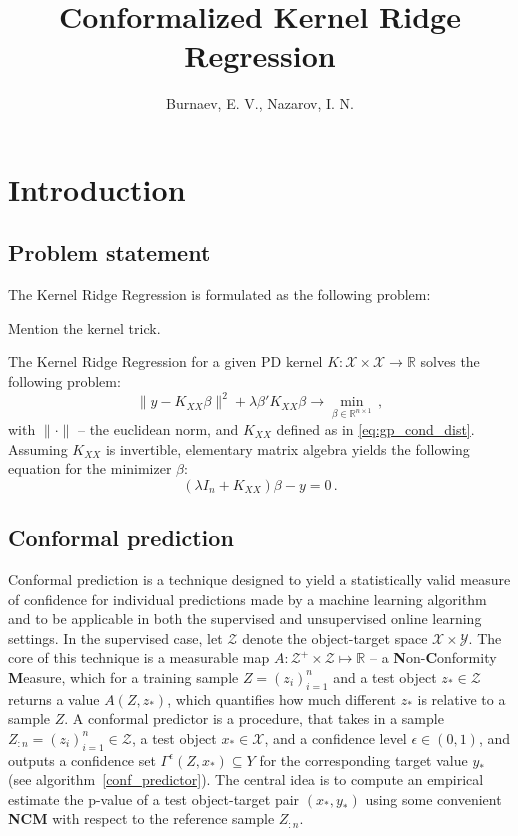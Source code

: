 \documentclass[a4paper]{article}
\title{Conformalized Kernel Ridge Regression}
\author{Burnaev, E. V., Nazarov, I. N.}
\newcommand{\Xcal}{\mathcal{X}}
\newcommand{\Ycal}{\mathcal{Y}}
\newcommand{\Zcal}{\mathcal{Z}}
\newcommand{\Real}{\mathbb{R}}
\begin{document}
\maketitle
\tableofcontents
\clearpage

\section{Introduction} %
\label{sec:introduction}

\subsection{Problem statement} %
\label{sub:problem_statement}

The Kernel Ridge Regression is formulated as the following problem:

Mention the kernel trick.

The Kernel Ridge Regression for a given PD kernel $K:\Xcal\times \Xcal \to \Real$
solves the following problem:
\begin{equation*}
  \|y - K_{XX}\beta\|^2 + \lambda \beta' K_{XX} \beta
    \to \min_{\beta\in \Real^{n\times 1}}
    \,,
\end{equation*}
with $\|\cdot\|$ -- the euclidean norm, and $K_{XX}$ defined as in \ref{eq:gp_cond_dist}.
Assuming $K_{XX}$ is invertible, elementary matrix algebra yields the following
equation for the minimizer $\beta$:
\begin{equation*}
  (\lambda I_n + K_{XX}) \beta - y = 0 \,.
\end{equation*}


\subsection{Conformal prediction} %
\label{sub:conformal_prediction}

Conformal prediction is a technique designed to yield a statistically valid measure
of confidence for individual predictions made by a machine learning algorithm and
to be applicable in both the supervised and unsupervised online learning settings.
In the supervised case, let $\Zcal$ denote the object-target space $\Xcal \times \Ycal$.
The core of this technique is a measurable map $A: \Zcal^+\times \Zcal \mapsto \Real$
-- a \textbf{N}on-\textbf{C}onformity \textbf{M}easure, which for a training sample
$Z = (z_i)_{i=1}^n$ and a test object $z_*\in \Zcal$ returns a value $A(Z, z_*)$,
which quantifies how much different $z_*$ is relative to a sample $Z$. A conformal
predictor is a procedure, that takes in a sample $Z_{:n}=(z_i)_{i=1}^n\in\Zcal$,
a test object $x_*\in\Xcal$, and a confidence level $\epsilon\in(0,1)$, and outputs
a confidence set $\Gamma^\epsilon(Z, x_*) \subseteq Y$ for the corresponding target
value $y_*$ (see algorithm~\ref{conf_predictor}). The central idea is to compute
an empirical estimate the p-value of a test object-target pair $(x_*, y_*)$ using
some convenient \textbf{NCM} with respect to the reference sample $Z_{:n}$.
\end{document}
